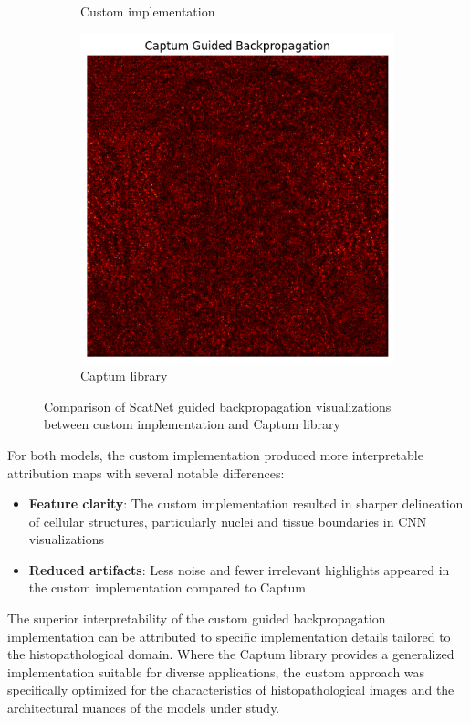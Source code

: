 \documentclass[10pt,twocolumn]{article}
\begin{document}
\begin{figure}[h]
\begin{subfigure}{0.32\columnwidth}
\caption{Custom implementation}
\end{subfigure}
\hfill
\begin{subfigure}{0.32\columnwidth}
\includegraphics[width=\linewidth]{imgs/scatnet_gbp_captum.png}
\caption{Captum library}
\end{subfigure}
\caption{Comparison of ScatNet guided backpropagation visualizations between custom implementation and Captum library}
\label{fig:gbp_comparison_scatnet}
\end{figure}

For both models, the custom implementation produced more interpretable attribution maps with several notable differences:

\begin{itemize}
    \item \textbf{Feature clarity}: The custom implementation resulted in sharper delineation of cellular structures, particularly nuclei and tissue boundaries in CNN visualizations
    \item \textbf{Reduced artifacts}: Less noise and fewer irrelevant highlights appeared in the custom implementation compared to Captum
\end{itemize}

The superior interpretability of the custom guided backpropagation implementation can be attributed to specific implementation details tailored to the histopathological domain. Where the Captum library provides a generalized implementation suitable for diverse applications, the custom approach was specifically optimized for the characteristics of histopathological images and the architectural nuances of the models under study.
\end{document}
